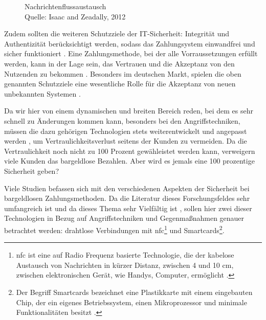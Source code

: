 \vfill
\begin{figure}[H]
    \caption{Nachrichtenflussaustausch \\ Quelle: Isaac and Zeadally, 2012}
    \label{fig:refart:JTAS_2}
\end{figure}

Zudem sollten die weiteren Schutzziele der IT-Sicherheit: Integrität und Authentizität berücksichtigt werden, 
sodass das Zahlungsystem einwandfrei und sicher funktioniert \cite{refip:GMPS}. Eine Zahlungsmethode, bei der 
alle Vorraussetzungen erfüllt werden, kann in der Lage sein, das Vertrauen und die Akzeptanz von den Nutzenden 
zu bekommen \cite{refart:HARE}. Besonders im deutschen Markt, spielen die oben genannten Schutzziele eine 
wesentliche Rolle für die Akzeptanz von neuen unbekannten Systemen \cite{refip:DKAM}.

Da wir hier von einem dynamischen und breiten Bereich reden, bei dem es sehr schnell zu Änderungen kommen kann, 
besonders bei den Angriffstechniken, müssen die dazu gehörigen Technologien stets weiterentwickelt und angepasst
werden \cite{refip:NYRS}, um Vertraulichkeitsverlust seitens der Kunden zu vermeiden. Da die Vertraulichkeit noch
nicht zu 100 Prozent gewähleistet werden kann, verweigern viele Kunden das bargeldlose Bezahlen. Aber
wird es jemals eine 100 prozentige Sicherheit geben?

Viele Studien befassen sich mit den verschiedenen Aspekten der Sicherheit bei bargeldlosen Zahlungsmethoden.
Da die Literatur dieses Forschungsfeldes sehr umfangreich ist und da dieses Thema sehr Vielfältig ist 
\cite{refip:GMPS}, sollen hier zwei dieser Technologien in Bezug auf Angriffstechniken und Gegenmaßnahmen 
genauer betrachtet werden: drahtlose Verbindungen mit \acrfull{nfc}\footnote{\acrfull{nfc} ist eine auf Radio Frequenz
basierte Technologie, die der kabelose Austausch von Nachrichten in kürzer Distanz, zwischen 4 und 10 cm, 
zwischen elektronischen Gerät, wie Handys, Computer, ermöglicht \cite{refart:NFNK}.} und Smartcards\footnote{Der
Begriff Smartcards bezeichnet eine Plastikkarte mit einem eingebauten Chip, der ein eigenes Betriebssystem, 
einen Mikroprozessor und minimale Funktionalitäten besitzt \cite{refip:JFSB}.}.


